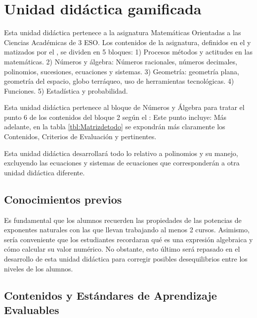 \section{Unidad didáctica gamificada}

\label{sec:UD}
%
Esta unidad didáctica pertenece a la asignatura Matemáticas Orientadas a las Ciencias Académicas de 3 ESO. 
%
Los contenidos de la asignatura, definidos en el \boe y matizados por el \bocm, se dividen en 5 bloques:
1) Procesos métodos y actitudes en las matemáticas. 
2) Números y álgebra: Números racionales, números decimales, polinomios, sucesiones, ecuaciones y sistemas.
3) Geometría: geometría plana, geometría del espacio, globo terráqueo, uso de herramientas tecnológicas.
4) Funciones.
5) Estadística y probabilidad.

Esta unidad didáctica pertenece al bloque de Números y Álgebra para tratar el punto 6 de los contenidos del bloque 2 según el \bocm: 
%
Este punto incluye:
%
%
Más adelante, en la tabla \ref{tbl:Matrizdetodo} se expondrán más claramente los Contenidos, Criterios de Evaluación y \eaes pertinentes.

Esta unidad didáctica desarrollará todo lo relativo a polinomios y su manejo, excluyendo las ecuaciones y sistemas de ecuaciones que corresponderán a otra unidad didáctica diferente.

\subsection{Conocimientos previos}

Es fundamental que los alumnos recuerden las propiedades de las potencias de exponentes naturales con las que llevan trabajando al menos 2 cursos.
%
Asimismo, sería conveniente que los estudiantes recordaran qué es una expresión algebraica y cómo calcular su valor numérico.
%
No obstante, esto último será repasado en el desarrollo de esta unidad didáctica para corregir posibles desequilibrios entre los niveles de los alumnos.



\subsection{Contenidos y Estándares de Aprendizaje Evaluables}

